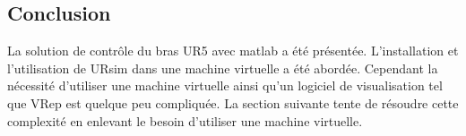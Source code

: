 \documentclass[root.tex]{subfiles}
\begin{document}
\subsection{Conclusion}

La solution de contrôle du bras UR5 avec matlab a été présentée.
L'installation et l'utilisation de URsim dans une machine virtuelle a été abordée.
Cependant la nécessité d'utiliser une machine virtuelle ainsi qu'un logiciel de visualisation tel que VRep est quelque peu compliquée.
La section suivante tente de résoudre cette complexité en enlevant le besoin d'utiliser une machine virtuelle.


\newpage
\end{document}
